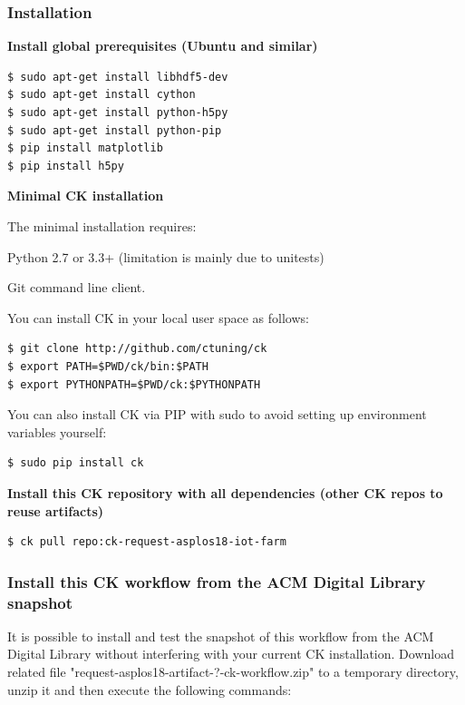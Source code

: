 \documentclass[sigplan]{acmart}
\newenvironment{packed_itemize}{
\begin{itemize}
  \setlength{\itemsep}{1pt}
  \setlength{\parskip}{0pt}
  \setlength{\parsep}{0pt}
}{\end{itemize}}
\begin{document}
\subsubsection{Installation}

\textbf{Install global prerequisites (Ubuntu and similar)}

\begin{verbatim}
$ sudo apt-get install libhdf5-dev
$ sudo apt-get install cython
$ sudo apt-get install python-h5py
$ sudo apt-get install python-pip
$ pip install matplotlib
$ pip install h5py
\end{verbatim}

\textbf{Minimal CK installation}

The minimal installation requires:

\begin{packed_itemize}
 \item Python 2.7 or 3.3+ (limitation is mainly due to unitests)
 \item Git command line client.
\end{packed_itemize}

You can install CK in your local user space as follows:

\begin{verbatim}
$ git clone http://github.com/ctuning/ck
$ export PATH=$PWD/ck/bin:$PATH
$ export PYTHONPATH=$PWD/ck:$PYTHONPATH
\end{verbatim}

You can also install CK via PIP with sudo to avoid setting up environment variables yourself:

\begin{verbatim}
$ sudo pip install ck
\end{verbatim}

\textbf{Install this CK repository with all dependencies (other CK repos to reuse artifacts)}
\begin{verbatim}$ ck pull repo:ck-request-asplos18-iot-farm\end{verbatim}

\subsubsection{Install this CK workflow from the ACM Digital Library snapshot}

It is possible to install and test the snapshot of this workflow 
from the ACM Digital Library without interfering with your current CK installation.
Download related file "request-asplos18-artifact-?-ck-workflow.zip"
to a temporary directory, unzip it and then execute the following commands:
\end{document}
